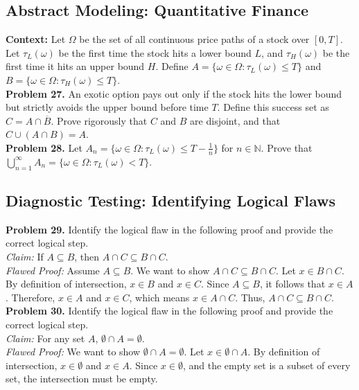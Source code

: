 \documentclass[11pt]{article}
\begin{document}
\subsection{Abstract Modeling: Quantitative Finance}
\noindent \textbf{Context:} Let $\Omega$ be the set of all continuous price paths of a stock over $[0, T]$. Let $\tau_L(\omega)$ be the first time the stock hits a lower bound $L$, and $\tau_H(\omega)$ be the first time it hits an upper bound $H$. Define $A = \{\omega \in \Omega : \tau_L(\omega) \le T\}$ and $B = \{\omega \in \Omega : \tau_H(\omega) \le T\}$. \\
\textbf{Problem 27.} An exotic option pays out only if the stock hits the lower bound but strictly avoids the upper bound before time $T$. Define this success set as $C = A \cap \overline{B}$. Prove rigorously that $C$ and $B$ are disjoint, and that $C \cup (A \cap B) = A$. \\
\textbf{Problem 28.} Let $A_n = \{\omega \in \Omega : \tau_L(\omega) \le T - \frac{1}{n}\}$ for $n \in \mathbb{N}$. Prove that $\bigcup_{n=1}^\infty A_n = \{\omega \in \Omega : \tau_L(\omega) < T\}$.

\subsection{Diagnostic Testing: Identifying Logical Flaws}
\noindent \textbf{Problem 29.} Identify the logical flaw in the following proof and provide the correct logical step. \\
\textit{Claim:} If $A \subseteq B$, then $A \cap C \subseteq B \cap C$. \\
\textit{Flawed Proof:} Assume $A \subseteq B$. We want to show $A \cap C \subseteq B \cap C$. Let $x \in B \cap C$. By definition of intersection, $x \in B$ and $x \in C$. Since $A \subseteq B$, it follows that $x \in A$. Therefore, $x \in A$ and $x \in C$, which means $x \in A \cap C$. Thus, $A \cap C \subseteq B \cap C$. \\
\textbf{Problem 30.} Identify the logical flaw in the following proof and provide the correct logical step. \\
\textit{Claim:} For any set $A$, $\emptyset \cap A = \emptyset$. \\
\textit{Flawed Proof:} We want to show $\emptyset \cap A = \emptyset$. Let $x \in \emptyset \cap A$. By definition of intersection, $x \in \emptyset$ and $x \in A$. Since $x \in \emptyset$, and the empty set is a subset of every set, the intersection must be empty.
\end{document}
